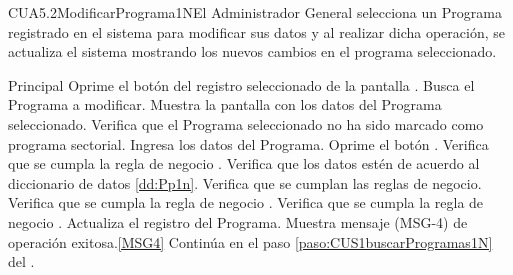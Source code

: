 	\begin{UseCase}{CUA5.2}{ModificarPrograma1N}{El Administrador General selecciona un Programa registrado en el sistema para modificar sus datos y al realizar dicha operación, se actualiza el sistema mostrando los nuevos cambios en el programa seleccionado.}
	\end{UseCase}

	\begin{UCtrayectoria}{Principal}
                       \UCpaso[\UCactor] Oprime el bot\'on  del registro seleccionado de la pantalla .
                         \UCpaso [\UCactor] Busca el Programa a modificar.
			\UCpaso Muestra la pantalla  con los datos del Programa seleccionado.
			\UCpaso Verifica que el Programa seleccionado no ha sido marcado como programa sectorial.
			\UCpaso [\UCactor] Ingresa los datos del Programa.\label{paso:CUS1.2ingresaDatosPrograma1N}
			\UCpaso [\UCactor] Oprime el bot\'on .
			\UCpaso Verifica que se cumpla la regla de negocio .
			\UCpaso Verifica que los datos est\'en de acuerdo al diccionario de datos \ref{dd:Pp1n}. 
			\UCpaso Verifica que se cumplan las reglas de negocio. 
			\UCpaso Verifica que se cumpla la regla de negocio .  
			\UCpaso Verifica que se cumpla la regla de negocio .  
			\UCpaso Actualiza el registro del Programa.\label{paso:CUS1.2ActualizaDatosPrograma1N}
                        \UCpaso Muestra mensaje (MSG-4) de operación exitosa.\ref{MSG4}
			\UCpaso Contin\'ua en el paso \ref{paso:CUS1buscarProgramas1N} del .
	\end{UCtrayectoria}

